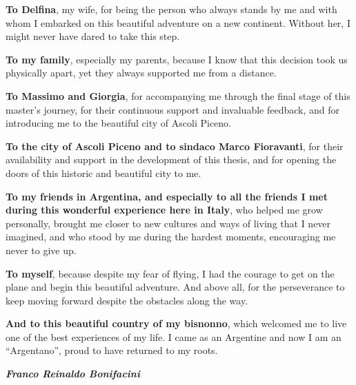 \documentclass[a4paper, 12pt, twoside]{report}  %
\begin{document}
\textbf{To Delfina}, my wife, for being the person who always stands by me and with whom I embarked on this beautiful adventure on a new continent. Without her, I might never have dared to take this step.

\textbf{To my family}, especially my parents, because I know that this decision took us physically apart, yet they always supported me from a distance.

\textbf{To Massimo and Giorgia}, for accompanying me through the final stage of this master’s journey, for their continuous support and invaluable feedback, and for introducing me to the beautiful city of Ascoli Piceno.

\textbf{To the city of Ascoli Piceno and to sindaco Marco Fioravanti}, for their availability and support in the development of this thesis, and for opening the doors of this historic and beautiful city to me.

\textbf{To my friends in Argentina, and especially to all the friends I met during this wonderful experience here in Italy}, who helped me grow personally, brought me closer to new cultures and ways of living that I never imagined, and who stood by me during the hardest moments, encouraging me never to give up.

\textbf{To myself}, because despite my fear of flying, I had the courage to get on the plane and begin this beautiful adventure. And above all, for the perseverance to keep moving forward despite the obstacles along the way.

\textbf{And to this beautiful country of my bisnonno}, which welcomed me to live one of the best experiences of my life. I came as an Argentine and now I am an “Argentano”, proud to have returned to my roots.

\begin{flushright}
    \textbf{\textit{Franco Reinaldo Bonifacini}}\\[0.1cm]
\end{flushright}

\cleardoublepage

\tableofcontents

\newpage

\listoffigures

\newpage
{}
\end{document}
